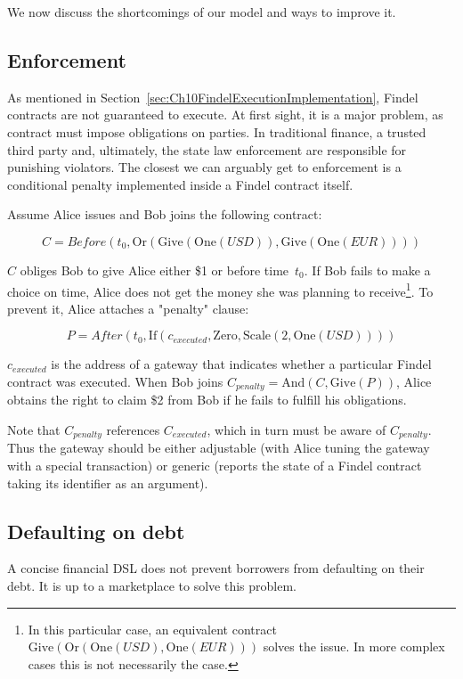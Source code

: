 We now discuss the shortcomings of our model and ways to improve it.

\subsection{Enforcement} \label{sec:Ch10FindelEnforcement}

As mentioned in Section~\ref{sec:Ch10FindelExecutionImplementation}, Findel contracts are not guaranteed to execute.
At first sight, it is a major problem, as contract must impose obligations on parties.
In traditional finance, a trusted third party and, ultimately, the state law enforcement are responsible for punishing violators.
The closest we can arguably get to enforcement is a conditional penalty implemented inside a Findel contract itself.

Assume Alice issues and Bob joins the following contract:

\[C=Before(t_0,\mathrm{Or}(\mathrm{Give}(\mathrm{One}(USD)),\mathrm{Give}(\mathrm{One}(EUR))))\]

\(C\) obliges Bob to give Alice either \$1 or  before time~$t_0$.
If Bob fails to make a choice on time, Alice does not get the money she was planning to receive\footnote{In this particular case, an equivalent contract \(\mathrm{Give}(\mathrm{Or}(\mathrm{One}(USD),\mathrm{One}(EUR)))\) solves the issue. In more complex cases this is not necessarily the case.}.
To prevent it, Alice attaches a "penalty" clause:

\[P=After(t_0,\mathrm{If}(c_{executed},\mathrm{Zero},\mathrm{Scale}(2,\mathrm{One}(USD))))\]

\(c_{executed}\) is the address of a gateway that indicates whether a particular Findel contract was executed.
When Bob joins \(C_{penalty}=\mathrm{And}(C,\mathrm{Give}(P))\), Alice obtains the right to claim \$2 from Bob if he fails to fulfill his obligations.

Note that \(C_{penalty}\) references \(C_{executed}\), which in turn must be aware of \(C_{penalty}\).
Thus the gateway should be either adjustable (with Alice tuning the gateway with a special transaction) or generic (reports the state of a Findel contract taking its identifier as an argument).


\subsection{Defaulting on debt}

A concise financial DSL does not prevent borrowers from defaulting on their debt.
It is up to a marketplace to solve this problem.


